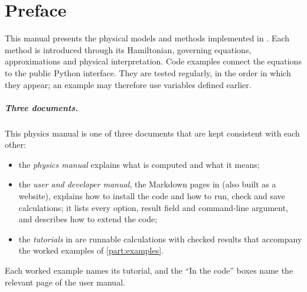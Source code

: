 \chapter{Preface}

This manual presents the physical models and methods implemented in \pkg{}.
Each method is introduced through its Hamiltonian, governing equations,
approximations and physical interpretation. Code examples connect the equations
to the public Python interface. They are tested regularly, in the order in which
they appear; an example may therefore use variables defined earlier.

\paragraph{Three documents.}
This physics manual is one of three documents that are kept consistent with each other:
\begin{itemize}
\item the \emph{physics manual} explains what is computed and what it means;
\item the \emph{user and developer manual}, the Markdown pages in  (also built as a
website), explains how to install the code and how to run, check and save calculations; it lists
every option, result field and command-line argument, and describes how to extend the code;
\item the \emph{tutorials} in  are runnable calculations with checked results
that accompany the worked examples of \cref{part:examples}.
\end{itemize}
Each worked example names its tutorial, and the \enquote{In the code} boxes name the relevant
page of the user manual.

